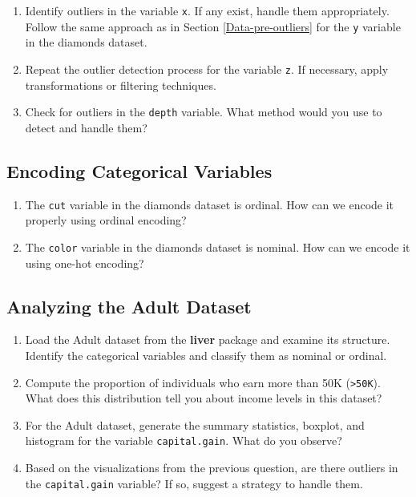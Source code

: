 \documentclass[
  11pt,
]{book}
\newcommand{\passthrough}[1]{#1}
\providecommand{\tightlist}{%
  \setlength{\itemsep}{0pt}\setlength{\parskip}{0pt}}
\theoremstyle{definition}
\theoremstyle{definition}
\theoremstyle{definition}
\theoremstyle{definition}
\theoremstyle{remark}
\begin{document}
\begin{enumerate}
\def\labelenumi{\arabic{enumi}.}
\setcounter{enumi}{4}
\tightlist
\item
  Identify outliers in the variable \passthrough{\lstinline!x!}. If any exist, handle them appropriately. Follow the same approach as in Section \ref{Data-pre-outliers} for the \passthrough{\lstinline!y!} variable in the diamonds dataset.\\
\item
  Repeat the outlier detection process for the variable \passthrough{\lstinline!z!}. If necessary, apply transformations or filtering techniques.\\
\item
  Check for outliers in the \passthrough{\lstinline!depth!} variable. What method would you use to detect and handle them?
\end{enumerate}

\subsection*{Encoding Categorical Variables}\label{encoding-categorical-variables-1}


\begin{enumerate}
\def\labelenumi{\arabic{enumi}.}
\setcounter{enumi}{7}
\tightlist
\item
  The \passthrough{\lstinline!cut!} variable in the diamonds dataset is ordinal. How can we encode it properly using ordinal encoding?\\
\item
  The \passthrough{\lstinline!color!} variable in the diamonds dataset is nominal. How can we encode it using one-hot encoding?
\end{enumerate}

\subsection*{Analyzing the Adult Dataset}\label{analyzing-the-adult-dataset}


\begin{enumerate}
\def\labelenumi{\arabic{enumi}.}
\setcounter{enumi}{9}
\tightlist
\item
  Load the Adult dataset from the \textbf{liver} package and examine its structure. Identify the categorical variables and classify them as nominal or ordinal.\\
\item
  Compute the proportion of individuals who earn more than 50K (\passthrough{\lstinline!>50K!}). What does this distribution tell you about income levels in this dataset?\\
\item
  For the Adult dataset, generate the summary statistics, boxplot, and histogram for the variable \passthrough{\lstinline!capital.gain!}. What do you observe?\\
\item
  Based on the visualizations from the previous question, are there outliers in the \passthrough{\lstinline!capital.gain!} variable? If so, suggest a strategy to handle them.
\end{enumerate}
\end{document}

